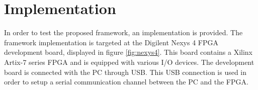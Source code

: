 \documentclass[openright]{uva-bachelor-thesis}
\begin{document}







\chapter{Implementation}
In order to test the proposed framework, an implementation is provided. The framework implementation is targeted at the Digilent Nexys 4 FPGA development board, displayed in figure \ref{fig:nexys4}. This board contains a Xilinx Artix-7 series FPGA and is equipped with various I/O devices. The development board is connected with the PC through USB. This USB connection is used in order to setup a serial communication channel between the PC and the FPGA.
\end{document}
